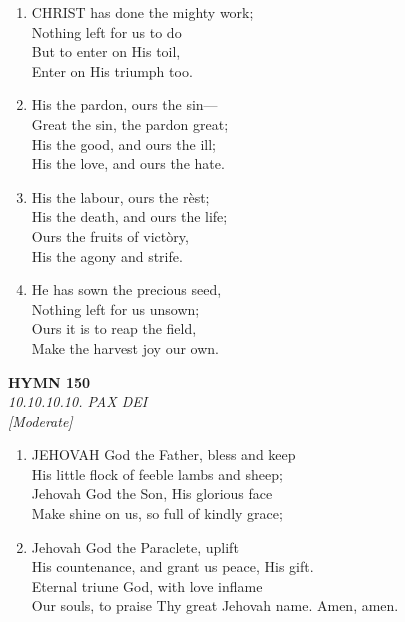 \begin{enumerate}
    \item CHRIST has done the mighty work; \\
        Nothing left for us to do \\
        But to enter on His toil, \\
        Enter on His triumph too.

    \item His the pardon, ours the sin--- \\
        Great the sin, the pardon great; \\
        His the good, and ours the ill; \\
        His the love, and ours the hate.

    \item His the labour, ours the r\`est; \\
        His the death, and ours the life; \\
        Ours the fruits of vict\`ory, \\
        His the agony and strife.

    \item He has sown the precious seed, \\
        Nothing left for us unsown; \\
        Ours it is to reap the field, \\
        Make the harvest joy our own.

\end{enumerate}

\newpage
\begin{center}
    {\Large \textbf{HYMN 150}}
    \\
    \textit{10.10.10.10. PAX DEI}
    \\
    \textit{\small [Moderate]}
\end{center}
\vspace{1em}

\begin{enumerate}
    \item JEHOVAH God the Father, bless and keep \\
        His little flock of feeble lambs and sheep; \\
        Jehovah God the Son, His glorious face \\
        Make shine on us, so full of kindly grace;

    \item Jehovah God the Paraclete, uplift \\
        His countenance, and grant us peace, His gift. \\
        Eternal triune God, with love inflame \\
        Our souls, to praise Thy great Jehovah name. Amen, amen.

\end{enumerate}

